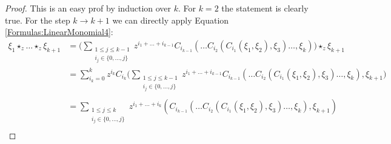 \begin{proof}
	This is an easy prof by induction over $k$. For $k = 2$ the statement is 
	clearly true. For the step $k \rightarrow k + 1$ we can directly 
	apply Equation \eqref{Formulas:LinearMonomial4}:
	\begin{align*}
		\xi_1 \star_z \ldots \star_z \xi_{k+1}
		& =
		\Bigg(
			\sum\limits_{\substack{
				1 \leq j \leq k-1 \\
				i_j \in \{0, \ldots, j\}
			}}
			z^{i_1 + \ldots + i_{k-1}}
			C_{i_{k-1}}
			\left(
				\ldots C_{i_2}
				\left(
					C_{i_1} 
					\left( \xi_1, \xi_2 \right)
					, \xi_3	
				\right) 
				\ldots, \xi_{k}
			\right)
		\Bigg)
		\star_z \xi_{k+1}
		\\
		& = 
		\sum\limits_{i_k = 0}^k
		z^{i_k}
		C_{i_k}
		\Bigg(
			\sum\limits_{\substack{
				1 \leq j \leq k-1 \\
				i_j \in \{0, \ldots, j\} \\
			}}
			z^{i_1 + \ldots + i_{k-1}}
			C_{i_{k-1}}
			\left(
				\ldots C_{i_2}
				\left(
					C_{i_1} 
					\left( \xi_1, \xi_2 \right)
					, \xi_3	
				\right) 
				\ldots, \xi_{k}
			\right)
			, \xi_{k+1}
		\Bigg)
		\\
		& = 
		\sum\limits_{\substack{
			1 \leq j \leq k \\
			i_j \in \{0, \ldots, j\} \\
		}}
		z^{i_1 + \ldots + i_k}
		\left(
			C_{i_{k-1}}
			\left(
				\ldots C_{i_2}
				\left(
					C_{i_1} 
					\left( \xi_1, \xi_2 \right)
					, \xi_3	
				\right) 
				\ldots, \xi_{k}
			\right)
			, \xi_{k+1}
		\right)
	\end{align*}
\end{proof}
